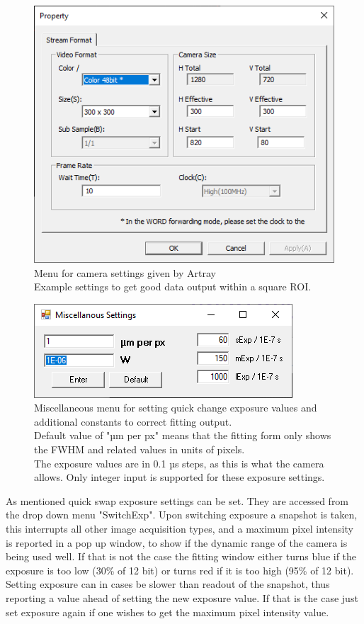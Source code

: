 \documentclass[twoside,openright]{scrreprt}
\begin{document}
{\begin{figure}[hbtp]
\centering
\includegraphics[width = 0.6\linewidth]{images/ArtrayExamplePics/StreamProperties.PNG}
\caption{Menu for camera settings given by Artray\\ Example settings to get good data output within a square ROI.\label{fig:artrayCameraSetting}}
\end{figure}

\begin{figure}[hbtp]
\centering
\includegraphics[scale=1]{images/ArtrayExamplePics/DefaultMiscSettings.PNG}
\caption{Miscellaneous menu for setting quick change exposure values and additional constants to correct fitting output.\\
Default value of "µm per px" means that the fitting form only shows the FWHM and related values in units of pixels.\\
The exposure values are in 0.1 µs steps, as this is what the camera allows. Only integer input is supported for these exposure settings.\label{LiveFitting:MiscMenu}}
\end{figure}



As mentioned quick swap exposure settings can be set. They are accessed from the drop down menu "SwitchExp". Upon switching exposure a snapshot is taken, this interrupts all other image acquisition types, and a maximum pixel intensity is reported in a pop up window, to show if the dynamic range of the camera is being used well. If that is not the case the fitting window either turns blue if the exposure is too low (30\% of 12 bit) or turns red if it is too high (95\% of 12 bit). Setting exposure can in cases be slower than readout of the snapshot, thus reporting a value ahead of setting the new exposure value. If that is the case just set exposure again if one wishes to get the maximum pixel intensity value.\\

}
\end{document}
